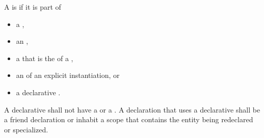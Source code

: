 \pnum
A  is  if it is part of
\begin{itemize}
\item
a ,
\item
an ,
\item
a 
that is the 
of a ,
\item
an 
of an explicit instantiation, or
\item
a declarative .
\end{itemize}
A declarative 
shall not have a  or
a .
A declaration that uses a declarative 
shall be a friend declaration or
inhabit a scope that contains the entity being redeclared or specialized.

